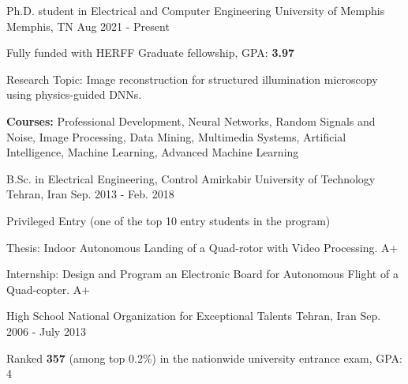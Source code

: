 

\begin{cventries}

  \cventry
    {Ph.D. student in Electrical and Computer Engineering} %
    {University of Memphis} %
    {Memphis, TN} %
    {Aug 2021 - Present} %
    {
      \begin{cvitems} %
        \item {Fully funded with HERFF Graduate fellowship, GPA:\textbf{ 3.97}}
        \item {Research Topic: Image reconstruction for structured illumination microscopy using physics-guided DNNs.}
        \item {\textbf{Courses:} Professional Development, Neural Networks, Random Signals and Noise, Image Processing, Data Mining, Multimedia Systems, Artificial Intelligence, Machine Learning, Advanced Machine Learning}
      \end{cvitems}
    }
    
  \cventry
    {B.Sc. in Electrical Engineering, Control} %
    {Amirkabir University of Technology} %
    {Tehran, Iran} %
    {Sep. 2013 - Feb. 2018} %
    {
      \begin{cvitems} %
        \item {Privileged Entry (one of the top 10 entry students in the program)}
        \item {Thesis: Indoor Autonomous Landing of a Quad-rotor with Video Processing. A+} 
        \item {Internship: Design and Program an Electronic Board for Autonomous Flight of a Quad-copter. A+}
      \end{cvitems}
    }
    
  \cventry
    {High School} %
    {National Organization for Exceptional Talents} %
    {Tehran, Iran} %
    {Sep. 2006 - July 2013} %
    {
      \begin{cvitems} %
        \item {Ranked \textbf{357} (among top 0.2\%) in the nationwide university entrance exam, GPA: 4}
      \end{cvitems}
    }
\end{cventries}
